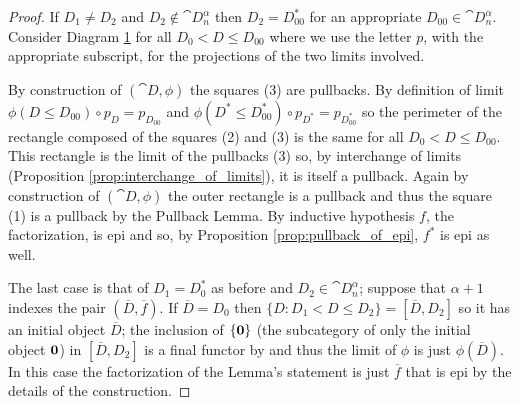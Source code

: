 \begin{proof}
  If \(D_1 \not= D_2\) and \(D_2\not\in\cat{D}_n^\alpha\) then \(D_2 = D_{00}^*\) for an appropriate \(D_{00}\in\cat{D}_n^\alpha\). Consider Diagram \ref{diagram:three_squares} for all \(D_0<D\leq D_{00}\) where we use the letter \(p\), with the appropriate subscript, for the projections of the two limits involved.
  \begin{figure}[h]
    \begin{center}
    \end{center}
    \caption{}
    \label{diagram:three_squares}
  \end{figure}
  By construction of \((\cat{D},\phi)\) the squares (3) are pullbacks. By definition of limit \(\phi(D\leq D_{00})\circ p_D = p_{D_{00}}\) and \(\phi(D^*\leq D_{00}^*)\circ p_{D^*} = p_{D_{00}^*}\) so the perimeter of the rectangle composed of the squares (2) and (3) is the same for all \(D_0<D\leq D_{00}\). This rectangle is the limit of the pullbacks (3) so, by interchange of limits (Proposition \ref{prop:interchange_of_limits}), it is itself a pullback. Again by construction of \((\cat{D}, \phi)\) the outer rectangle is a pullback and thus the square (1) is a pullback by the Pullback Lemma. By inductive hypothesis \(f\), the factorization, is epi and so, by Proposition \ref{prop:pullback_of_epi}, \(f^*\) is epi as well.

  The last case is that of \(D_1 = D_0^*\) as before and \(D_2\in\cat{D}_n^\alpha\); suppose that \(\alpha + 1\) indexes the pair \((\overline{D}, \overline{f})\). If \(\overline{D} = D_0\) then \(\{D\colon D_1<D\leq D_2\} = [\overline{D},D_2]\) so it has an initial object \(\overline{D}\); the inclusion of \(\{{\bf 0}\}\) (the subcategory of only the initial object \({\bf 0}\)) in \([\overline{D}, D_2]\) is a final functor by \cite[Proposition 2.11.4]{handbook1} and thus the limit of \(\phi\) is just \(\phi(\overline{D})\). In this case the factorization of the Lemma's statement is just \(\overline{f}\) that is epi by the details of the construction.


\end{proof}
